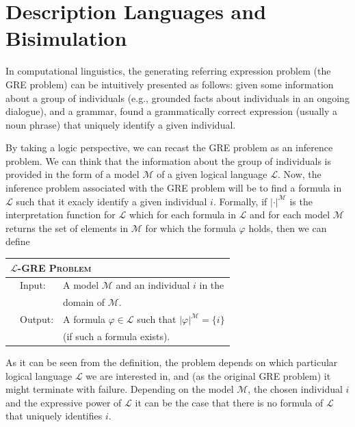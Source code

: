 \newcommand{\gM}{\mathcal{M}}
\newcommand{\gL}{\mathcal{L}}


\section{Description Languages and Bisimulation} \label{sec:bisim}

In computational linguistics, the generating referring expression problem (the GRE
problem) can be intuitively presented as follows: given some information about
a group of individuals (e.g., grounded facts about individuals in an ongoing dialogue),
and a grammar, found a grammatically correct expression (usually a noun phrase) that uniquely identify a given individual.

By taking a logic perspective, we can recast the GRE problem as an inference problem.
We can think that the information about the group of individuals is provided in the form
of a model $\gM$ of a given logical language $\gL$.  Now, the inference problem
associated with the GRE problem will be to find a formula in $\gL$ such that it
exacly identify a given individual $i$.  Formally, if $|\cdot|^\gM$ is the interpretation
function for $\gL$ which for each formula in $\gL$ and for each model $\gM$ returns
the set of elements in $\gM$ for which the formula $\varphi$ holds, then we can define
\medskip

\noindent
{\small
\begin{center}
\begin{tabular}{ll} \hline
\multicolumn{2}{l}{
\textsc{$\gL$-GRE Problem}}\\ \hline
\ \ Input: & A model $\gM$ and an individual $i$ in the\\
& \hspace*{0.5cm} domain of $\gM$.\\
\ \ Output: & A formula $\varphi \in \gL$ such that $|\varphi|^\gM = \{i\}$\\
& \hspace*{0.5cm} (if such a formula exists).\\ \hline
\end{tabular}
\end{center}}
\medskip

As it can be seen from the definition, the problem depends on which particular
logical language $\gL$ we are interested in, and (as the original GRE problem)
it might terminate with failure.  Depending on the model $\gM$, the chosen individual $i$
and the expressive power of $\gL$ it can be the case that there is no formula of
$\gL$ that uniquely identifies $i$.

